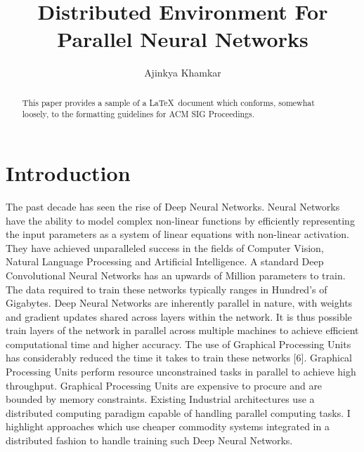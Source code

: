 \documentclass[sigconf]{acmart}
\begin{document}
\title{Distributed Environment For Parallel Neural Networks}


\author{Ajinkya Khamkar}

\renewcommand{\shortauthors}{B. Trovato et al.}


\begin{abstract}
This paper provides a sample of a \LaTeX\ document which conforms,
somewhat loosely, to the formatting guidelines for
ACM SIG Proceedings.
\end{abstract}



\maketitle

\section{Introduction}

The past decade has seen the rise of Deep Neural Networks. Neural Networks have the ability to model complex non-linear functions by efficiently representing the input parameters as a system of linear equations with non-linear activation. They have achieved unparalleled success in the fields of Computer Vision, Natural Language Processing and Artificial Intelligence. A standard Deep Convolutional Neural Networks has an upwards of Million parameters to train\cite{NIPS2012_4824}. The data required to train these networks typically ranges in Hundred's of Gigabytes. Deep Neural Networks are inherently parallel in nature, with weights and gradient updates shared across layers within the network. It is thus possible train layers of the network in parallel across multiple machines to achieve efficient computational time and higher accuracy. The use of Graphical Processing Units has considerably reduced the time it takes to train these networks [6]. Graphical Processing Units perform resource unconstrained tasks in parallel to achieve high throughput. Graphical Processing Units are expensive to procure and are bounded by memory constraints. Existing Industrial architectures use a distributed computing paradigm capable of handling parallel computing tasks. I highlight approaches which use cheaper commodity systems integrated in a distributed fashion to handle training such Deep Neural Networks.
\end{document}
